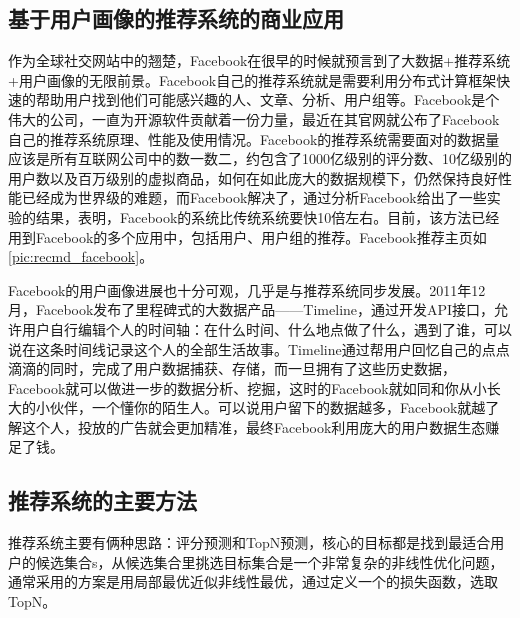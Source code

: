 		\subsection{基于用户画像的推荐系统的商业应用}
		\begin{figure}
	    \centering
	      \label{pic:recmd_facebook}
	    \end{figure}
		作为全球社交网站中的翘楚，Facebook在很早的时候就预言到了大数据+推荐系统+用户画像的无限前景。Facebook自己的推荐系统就是需要利用分布式计算框架快速的帮助用户找到他们可能感兴趣的人、文章、分析、用户组等。Facebook是个伟大的公司，一直为开源软件贡献着一份力量，最近在其官网就公布了Facebook自己的推荐系统原理、性能及使用情况\citep{recmd-facebook}。Facebook的推荐系统需要面对的数据量应该是所有互联网公司中的数一数二，约包含了1000亿级别的评分数、10亿级别的用户数以及百万级别的虚拟商品，如何在如此庞大的数据规模下，仍然保持良好性能已经成为世界级的难题，而Facebook解决了，通过分析Facebook给出了一些实验的结果，表明，Facebook的系统比传统系统要快10倍左右。目前，该方法已经用到Facebook的多个应用中，包括用户、用户组的推荐。Facebook推荐主页如\autoref{pic:recmd_facebook}。
		
		Facebook的用户画像进展也十分可观，几乎是与推荐系统同步发展。2011年12月，Facebook发布了里程碑式的大数据产品——Timeline，通过开发API接口，允许用户自行编辑个人的时间轴：在什么时间、什么地点做了什么，遇到了谁，可以说在这条时间线记录这个人的全部生活故事。Timeline通过帮用户回忆自己的点点滴滴的同时，完成了用户数据捕获、存储，而一旦拥有了这些历史数据，Facebook就可以做进一步的数据分析、挖掘，这时的Facebook就如同和你从小长大的小伙伴，一个懂你的陌生人。可以说用户留下的数据越多，Facebook就越了解这个人，投放的广告就会更加精准，最终Facebook利用庞大的用户数据生态赚足了钱。

		\subsection{推荐系统的主要方法}
		推荐系统主要有俩种思路：评分预测和TopN预测，核心的目标都是找到最适合用户的候选集合s，从候选集合里挑选目标集合是一个非常复杂的非线性优化问题，通常采用的方案是用局部最优近似非线性最优，通过定义一个的损失函数，选取TopN\citep{recmd-Next}。

